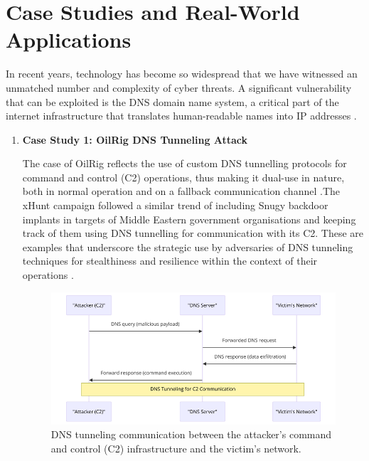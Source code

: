 \section{Case Studies and Real-World Applications}

In recent years, technology has become so widespread that we have witnessed an unmatched number and complexity of cyber threats. A significant vulnerability that can be exploited is the DNS domain name system, a critical part of the internet infrastructure that translates human-readable names into IP addresses \cite{kumari2021sac115}. 

\begin{enumerate} 

\item\textbf{ Case Study 1: OilRig DNS Tunneling Attack }

The case of OilRig reflects the use of custom DNS tunnelling protocols for command and control (C2) operations, thus making it dual-use in nature, both in normal operation and on a fallback communication channel \cite{paloaltonetworks2021dnsattacks}.The xHunt campaign \cite{unit42_xhunt_2021} followed a similar trend of including Snugy backdoor implants in targets of Middle Eastern government organisations and keeping track of them using DNS tunnelling for communication with its C2.  These are examples that underscore the strategic use by adversaries of DNS tunneling techniques for stealthiness and resilience within the context of their operations \cite{unit42_2021}.

\captionsetup{font= footnotesize}
\begin{figure}[H]
    \centering
    \includegraphics[width=\textwidth]{background/DNSTuu.png}
    \caption{DNS tunneling communication between the attacker's command and control (C2) infrastructure and the victim's network.}
    \label{fig:figTen}
\end{figure}




\end{enumerate}

